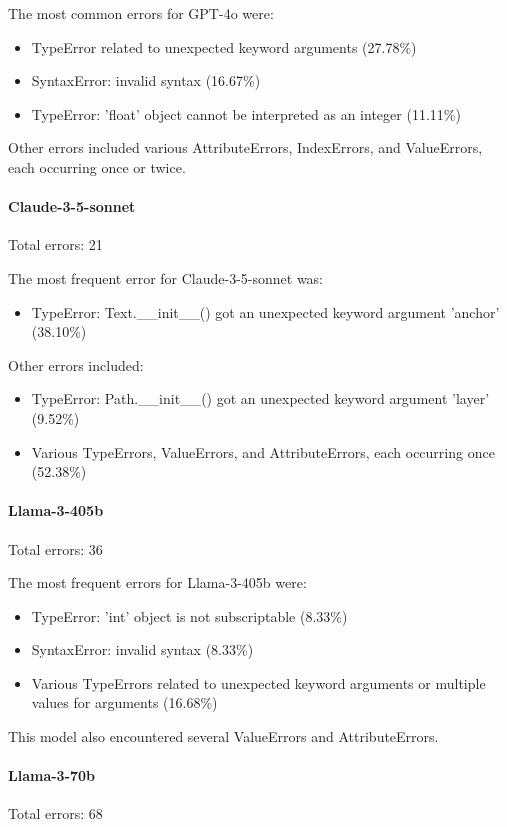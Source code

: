 \documentclass{article}
\begin{document}
The most common errors for GPT-4o were:
\begin{itemize}
    \item TypeError related to unexpected keyword arguments (27.78\%)
    \item SyntaxError: invalid syntax (16.67\%)
    \item TypeError: 'float' object cannot be interpreted as an integer (11.11\%)
\end{itemize}

Other errors included various AttributeErrors, IndexErrors, and ValueErrors, each occurring once or twice.

\paragraph{Claude-3-5-sonnet}
Total errors: 21

The most frequent error for Claude-3-5-sonnet was:
\begin{itemize}
    \item TypeError: Text.\_\_init\_\_() got an unexpected keyword argument 'anchor' (38.10\%)
\end{itemize}

Other errors included:
\begin{itemize}
    \item TypeError: Path.\_\_init\_\_() got an unexpected keyword argument 'layer' (9.52\%)
    \item Various TypeErrors, ValueErrors, and AttributeErrors, each occurring once (52.38\%)
\end{itemize}

\paragraph{Llama-3-405b}
Total errors: 36

The most frequent errors for Llama-3-405b were:
\begin{itemize}
    \item TypeError: 'int' object is not subscriptable (8.33\%)
    \item SyntaxError: invalid syntax (8.33\%)
    \item Various TypeErrors related to unexpected keyword arguments or multiple values for arguments (16.68\%)
\end{itemize}

This model also encountered several ValueErrors and AttributeErrors.

\paragraph{Llama-3-70b}
Total errors: 68
\end{document}
